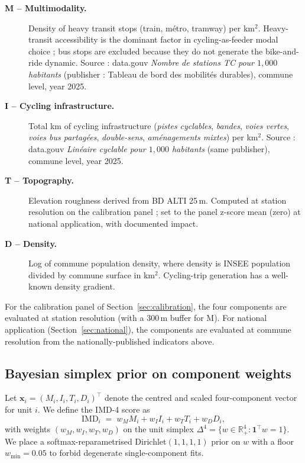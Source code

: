 \documentclass[11pt,a4paper]{article}
\newcommand{\IMD}{\mathrm{IMD}}
\begin{document}
\begin{description}
    \item[\textbf{M -- Multimodality.}]  Density of heavy transit
          stops (train, m\'etro, tramway) per km$^2$.  Heavy-transit
          accessibility is the dominant factor in cycling-as-feeder
          modal choice ; bus stops are excluded because they do
          not generate the bike-and-ride dynamic.
          Source : data.gouv \emph{Nombre de stations TC pour
          $1{,}000$ habitants} (publisher : Tableau de bord des
          mobilit\'es durables), commune level, year 2025.

    \item[\textbf{I -- Cycling infrastructure.}]  Total km of cycling
          infrastructure (\emph{pistes cyclables}, \emph{bandes},
          \emph{voies vertes}, \emph{voies bus partag\'ees},
          \emph{double-sens}, \emph{am\'enagements mixtes}) per
          km$^2$.  Source : data.gouv \emph{Lin\'eaire cyclable
          pour $1{,}000$ habitants} (same publisher), commune level,
          year 2025.

    \item[\textbf{T -- Topography.}]  Elevation roughness derived
          from BD ALTI 25\,m.  Computed at station resolution on the
          calibration panel ; set to the panel z-score mean (zero) at
          national application, with documented impact.

    \item[\textbf{D -- Density.}]  Log of commune population density,
          where density is INSEE population divided by commune
          surface in km$^2$.  Cycling-trip generation has a well-known
          density gradient.
\end{description}

For the calibration panel of Section~\ref{sec:calibration}, the four
components are evaluated at station resolution (with a 300\,m buffer
for M).  For national application (Section~\ref{sec:national}), the
components are evaluated at commune resolution from the
nationally-published indicators above.

\subsection{Bayesian simplex prior on component weights}
\label{sec:bayes}

Let $\mathbf{x}_i = (M_i, I_i, T_i, D_i)^{\top}$ denote the centred
and scaled four-component vector for unit $i$.  We define the IMD-4
score as
\[
    \IMD_i \;=\; w_M M_i + w_I I_i + w_T T_i + w_D D_i,
\]
with weights $(w_M, w_I, w_T, w_D)$ on the unit simplex
$\Delta^{4} = \{ w \in \mathbb{R}_{+}^{4} : \mathbf{1}^{\top} w = 1 \}$.
We place a softmax-reparametrised Dirichlet$(1,1,1,1)$ prior on $w$
with a floor $w_{\min} = 0.05$ to forbid degenerate
single-component fits.
\end{document}
